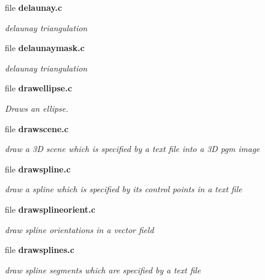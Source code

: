 \begin{CompactItemize}
\item 
file {\bf delaunay.c}
\begin{CompactList}\small\item\em delaunay triangulation \item\end{CompactList}

\item 
file {\bf delaunaymask.c}
\begin{CompactList}\small\item\em delaunay triangulation \item\end{CompactList}

\item 
file {\bf drawellipse.c}
\begin{CompactList}\small\item\em Draws an ellipse. \item\end{CompactList}

\item 
file {\bf drawscene.c}
\begin{CompactList}\small\item\em draw a 3D scene which is specified by a text file into a 3D pgm image \item\end{CompactList}

\item 
file {\bf drawspline.c}
\begin{CompactList}\small\item\em draw a spline which is specified by its control points in a text file \item\end{CompactList}

\item 
file {\bf drawsplineorient.c}
\begin{CompactList}\small\item\em draw spline orientations in a vector field \item\end{CompactList}

\item 
file {\bf drawsplines.c}
\begin{CompactList}\small\item\em draw spline segments which are specified by a text file \item\end{CompactList}


\end{CompactItemize}

